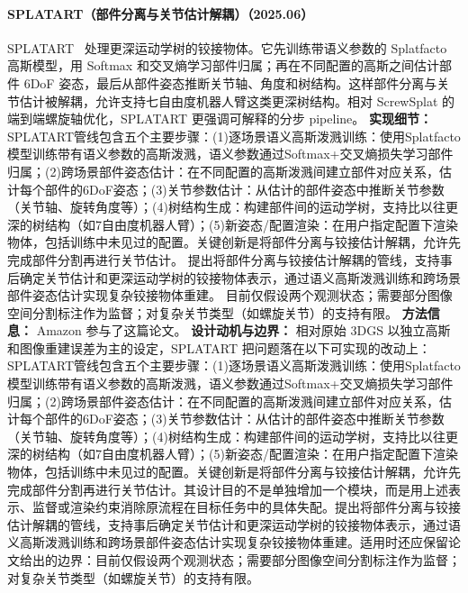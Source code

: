 \paragraph{SPLATART（部件分离与关节估计解耦）（2025.06）}
SPLATART~\cite{2506_12184} 处理更深运动学树的铰接物体。它先训练带语义参数的 Splatfacto 高斯模型，用 Softmax 和交叉熵学习部件归属；再在不同配置的高斯之间估计部件 6DoF 姿态，最后从部件姿态推断关节轴、角度和树结构。这样部件分离与关节估计被解耦，允许支持七自由度机器人臂这类更深树结构。相对 ScrewSplat 的端到端螺旋轴优化，SPLATART 更强调可解释的分步 pipeline。
\textbf{实现细节：} SPLATART管线包含五个主要步骤：(1)逐场景语义高斯泼溅训练：使用Splatfacto模型训练带有语义参数的高斯泼溅，语义参数通过Softmax+交叉熵损失学习部件归属；(2)跨场景部件姿态估计：在不同配置的高斯泼溅间建立部件对应关系，估计每个部件的6DoF姿态；(3)关节参数估计：从估计的部件姿态中推断关节参数（关节轴、旋转角度等）；(4)树结构生成：构建部件间的运动学树，支持比以往更深的树结构（如7自由度机器人臂）；(5)新姿态/配置渲染：在用户指定配置下渲染物体，包括训练中未见过的配置。关键创新是将部件分离与铰接估计解耦，允许先完成部件分割再进行关节估计。 提出将部件分离与铰接估计解耦的管线，支持事后确定关节估计和更深运动学树的铰接物体表示，通过语义高斯泼溅训练和跨场景部件姿态估计实现复杂铰接物体重建。 目前仅假设两个观测状态；需要部分图像空间分割标注作为监督；对复杂关节类型（如螺旋关节）的支持有限。
\textbf{方法信息：} Amazon 参与了这篇论文。
\textbf{设计动机与边界：} 相对原始 3DGS 以独立高斯和图像重建误差为主的设定，SPLATART 把问题落在以下可实现的改动上：SPLATART管线包含五个主要步骤：(1)逐场景语义高斯泼溅训练：使用Splatfacto模型训练带有语义参数的高斯泼溅，语义参数通过Softmax+交叉熵损失学习部件归属；(2)跨场景部件姿态估计：在不同配置的高斯泼溅间建立部件对应关系，估计每个部件的6DoF姿态；(3)关节参数估计：从估计的部件姿态中推断关节参数（关节轴、旋转角度等）；(4)树结构生成：构建部件间的运动学树，支持比以往更深的树结构（如7自由度机器人臂）；(5)新姿态/配置渲染：在用户指定配置下渲染物体，包括训练中未见过的配置。关键创新是将部件分离与铰接估计解耦，允许先完成部件分割再进行关节估计。其设计目的不是单独增加一个模块，而是用上述表示、监督或渲染约束消除原流程在目标任务中的具体失配。提出将部件分离与铰接估计解耦的管线，支持事后确定关节估计和更深运动学树的铰接物体表示，通过语义高斯泼溅训练和跨场景部件姿态估计实现复杂铰接物体重建。适用时还应保留论文给出的边界：目前仅假设两个观测状态；需要部分图像空间分割标注作为监督；对复杂关节类型（如螺旋关节）的支持有限。
